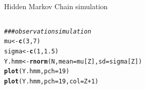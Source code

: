 \documentclass{beamer}\usepackage[]{graphicx}\usepackage[]{color}
\makeatletter
\newcommand{\hlnum}[1]{\textcolor[rgb]{0.686,0.059,0.569}{#1}}%
\newcommand{\hlcom}[1]{\textcolor[rgb]{0.678,0.584,0.686}{\textit{#1}}}%
\newcommand{\hlopt}[1]{\textcolor[rgb]{0,0,0}{#1}}%
\newcommand{\hlstd}[1]{\textcolor[rgb]{0.345,0.345,0.345}{#1}}%
\newcommand{\hlkwb}[1]{\textcolor[rgb]{0.69,0.353,0.396}{#1}}%
\newcommand{\hlkwc}[1]{\textcolor[rgb]{0.333,0.667,0.333}{#1}}%
\newcommand{\hlkwd}[1]{\textcolor[rgb]{0.737,0.353,0.396}{\textbf{#1}}}%
\newenvironment{kframe}{%
 \def\at@end@of@kframe{}%
 \ifinner\ifhmode%
  \def\at@end@of@kframe{\end{minipage}}%
  \begin{minipage}{\columnwidth}%
 \fi\fi%
 \def\FrameCommand##1{\hskip\@totalleftmargin \hskip-\fboxsep
 \colorbox{shadecolor}{##1}\hskip-\fboxsep
     \hskip-\linewidth \hskip-\@totalleftmargin \hskip\columnwidth}%
 \MakeFramed {\advance\hsize-\width
   \@totalleftmargin\z@ \linewidth\hsize
   \@setminipage}}%
 {\par\unskip\endMakeFramed%
 \at@end@of@kframe}
\newenvironment{knitrout}{}{} %
\makeatother
\begin{document}
\begin{frame}[fragile]{Hidden Markov Chain simulation}
\begin{columns}
\begin{column}{0.5\textwidth}
\begin{knitrout}\tiny
{}\color{fgcolor}\begin{kframe}
\begin{alltt}
\hlcom{### observation simulation}
\hlstd{mu} \hlkwb{<-} \hlkwd{c}\hlstd{(}\hlnum{3}\hlstd{,} \hlnum{7}\hlstd{)}
\hlstd{sigma} \hlkwb{<-} \hlkwd{c}\hlstd{(}\hlnum{1}\hlstd{,}\hlnum{1.5}\hlstd{)}
\hlstd{Y.hmm} \hlkwb{<-} \hlkwd{rnorm}\hlstd{(N,} \hlkwc{mean}\hlstd{=mu[Z],} \hlkwc{sd}\hlstd{=sigma[Z])}
\hlkwd{plot}\hlstd{(Y.hmm,} \hlkwc{pch}\hlstd{=}\hlnum{19}\hlstd{)}
\hlkwd{plot}\hlstd{(Y.hmm,} \hlkwc{pch}\hlstd{=}\hlnum{19}\hlstd{,} \hlkwc{col}\hlstd{=Z}\hlopt{+}\hlnum{1}\hlstd{)}
\end{alltt}
\end{kframe}
\end{knitrout}
\end{column}
\begin{column}{0.4\textwidth}

\end{column}
\end{columns}
\end{frame}
\end{document}
